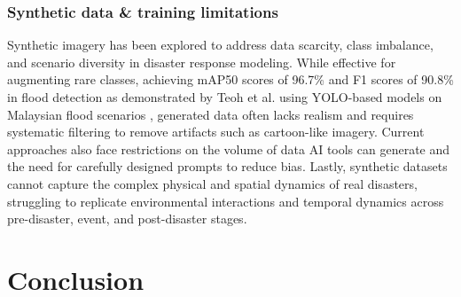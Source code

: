 \documentclass[conference,a4paper]{IEEEtran}
\begin{document}
\subsubsection{\textbf{Synthetic data \& training limitations}}
Synthetic imagery has been explored to address data scarcity, class imbalance, and scenario diversity in disaster response modeling. While effective for augmenting rare classes, achieving mAP50 scores of 96.7\% and F1 scores of 90.8\% in flood detection as demonstrated by Teoh et al. using YOLO-based models on Malaysian flood scenarios \cite{teohExploringGenerativeAI2024}, generated data often lacks realism and requires systematic filtering to remove artifacts such as cartoon-like imagery. Current approaches also face restrictions on the volume of data AI tools can generate and the need for carefully designed prompts to reduce bias. Lastly, synthetic datasets cannot capture the complex physical and spatial dynamics of real disasters, struggling to replicate environmental interactions and temporal dynamics across pre-disaster, event, and post-disaster stages.


\section{Conclusion}




  
\end{document}
